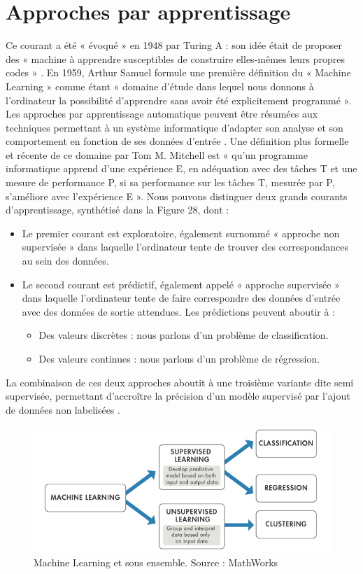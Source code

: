 \section{Approches par apprentissage}
Ce courant a été « évoqué » en 1948 par Turing A : son idée était de proposer des « machine à apprendre susceptibles de construire elles-mêmes leurs propres codes » \cite{Turing1950}. En 1959, Arthur Samuel  formule une première définition du « Machine Learning » comme étant « domaine d’étude dans lequel nous donnons à l’ordinateur la possibilité d’apprendre sans avoir été explicitement programmé ». Les approches par apprentissage automatique peuvent être résumées aux techniques permettant à un système informatique d’adapter son analyse et son comportement en fonction de ses données d’entrée  . Une définition plus formelle et récente de ce domaine par Tom M. Mitchell  est « qu’un programme informatique apprend d’une expérience E, en adéquation avec des tâches T et une mesure de performance P, si sa performance sur les tâches T, mesurée par P, s’améliore avec l’expérience E ».
Nous pouvons distinguer deux grands courants d’apprentissage, synthétisé dans la Figure 28, dont : 
\begin{itemize}
    \item Le premier courant est exploratoire, également surnommé « approche non supervisée » dans laquelle l’ordinateur tente de trouver des correspondances au sein des données.
    \item Le second courant est prédictif, également appelé « approche supervisée » dans laquelle l’ordinateur tente de faire correspondre des données d’entrée avec des données de sortie attendues. Les prédictions peuvent aboutir à :
    \begin{itemize}
	    \item Des valeurs discrètes : nous parlons d’un problème de classification.
	    \item Des valeurs continues : nous parlons d’un problème de régression.
	\end{itemize}
\end{itemize}

La combinaison de ces deux approches aboutit à une troisième variante dite semi supervisée, permettant d’accroître la précision d’un modèle supervisé par l’ajout de données non labelisées \cite{Murphy2012}.
 
 \begin{figure}[H]
    \centering
    \includegraphics[width=\linewidth]{contents/chapter_3/resources/MachineLearning.png}
    \caption{Machine Learning et sous ensemble. Source : MathWorks}
    \label{fig:chapter_3:machine_learning}
\end{figure}


